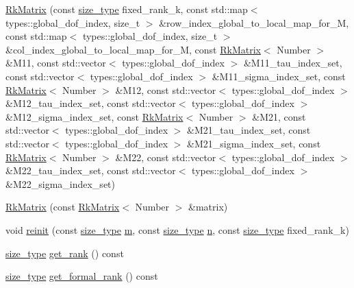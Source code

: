 \begin{DoxyCompactItemize}
\hyperlink{classRkMatrix_a08f64aa2d91226f2d4e4f84911be5079}{Rk\+Matrix} (const \hyperlink{classRkMatrix_add060bfc3a4cc77f858c3d6dd58cadd5}{size\+\_\+type} fixed\+\_\+rank\+\_\+k, const std\+::map$<$ types\+::global\+\_\+dof\+\_\+index, size\+\_\+t $>$ \&row\+\_\+index\+\_\+global\+\_\+to\+\_\+local\+\_\+map\+\_\+for\+\_\+M, const std\+::map$<$ types\+::global\+\_\+dof\+\_\+index, size\+\_\+t $>$ \&col\+\_\+index\+\_\+global\+\_\+to\+\_\+local\+\_\+map\+\_\+for\+\_\+M, const \hyperlink{classRkMatrix}{Rk\+Matrix}$<$ Number $>$ \&M11, const std\+::vector$<$ types\+::global\+\_\+dof\+\_\+index $>$ \&M11\+\_\+tau\+\_\+index\+\_\+set, const std\+::vector$<$ types\+::global\+\_\+dof\+\_\+index $>$ \&M11\+\_\+sigma\+\_\+index\+\_\+set, const \hyperlink{classRkMatrix}{Rk\+Matrix}$<$ Number $>$ \&M12, const std\+::vector$<$ types\+::global\+\_\+dof\+\_\+index $>$ \&M12\+\_\+tau\+\_\+index\+\_\+set, const std\+::vector$<$ types\+::global\+\_\+dof\+\_\+index $>$ \&M12\+\_\+sigma\+\_\+index\+\_\+set, const \hyperlink{classRkMatrix}{Rk\+Matrix}$<$ Number $>$ \&M21, const std\+::vector$<$ types\+::global\+\_\+dof\+\_\+index $>$ \&M21\+\_\+tau\+\_\+index\+\_\+set, const std\+::vector$<$ types\+::global\+\_\+dof\+\_\+index $>$ \&M21\+\_\+sigma\+\_\+index\+\_\+set, const \hyperlink{classRkMatrix}{Rk\+Matrix}$<$ Number $>$ \&M22, const std\+::vector$<$ types\+::global\+\_\+dof\+\_\+index $>$ \&M22\+\_\+tau\+\_\+index\+\_\+set, const std\+::vector$<$ types\+::global\+\_\+dof\+\_\+index $>$ \&M22\+\_\+sigma\+\_\+index\+\_\+set)
\item 
\hyperlink{classRkMatrix_a5f886128ba604cc85f99e3c9c9a07e7c}{Rk\+Matrix} (const \hyperlink{classRkMatrix}{Rk\+Matrix}$<$ Number $>$ \&matrix)
\item 
void \hyperlink{classRkMatrix_a5457372194e8009bffc7b88f11b95d03}{reinit} (const \hyperlink{classRkMatrix_add060bfc3a4cc77f858c3d6dd58cadd5}{size\+\_\+type} \hyperlink{classRkMatrix_a8ca8898bcfedeee135437833f83b144c}{m}, const \hyperlink{classRkMatrix_add060bfc3a4cc77f858c3d6dd58cadd5}{size\+\_\+type} \hyperlink{classRkMatrix_a06d3b6636bb423c391c66e4ccc722687}{n}, const \hyperlink{classRkMatrix_add060bfc3a4cc77f858c3d6dd58cadd5}{size\+\_\+type} fixed\+\_\+rank\+\_\+k)
\item 
\hyperlink{classRkMatrix_add060bfc3a4cc77f858c3d6dd58cadd5}{size\+\_\+type} \hyperlink{classRkMatrix_a1b2231c1e02862c91f4451e2b0a5fab4}{get\+\_\+rank} () const
\item 
\hyperlink{classRkMatrix_add060bfc3a4cc77f858c3d6dd58cadd5}{size\+\_\+type} \hyperlink{classRkMatrix_ae69122e3ee1c49a4fbe48cf3d7a20581}{get\+\_\+formal\+\_\+rank} () const

\end{DoxyCompactItemize}
